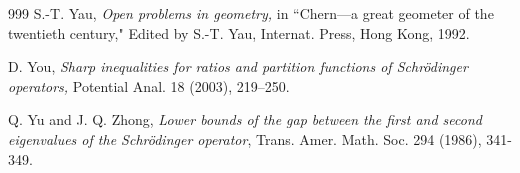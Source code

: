 \documentclass[11pt,leqno]{article}
\theoremstyle{definition}
\numberwithin{equation}{section}
\begin{document}
\begin{thebibliography}{999}
 S{.}-T{.} Yau, \emph{Open problems in geometry,} in 
``Chern---a great geometer of the twentieth century," Edited by  S{.}-T{.} Yau, 
Internat. Press, Hong Kong, 1992.

 D{.} You,  \emph{ Sharp inequalities for ratios and partition functions of
Schr\"odinger operators,} Potential Anal.  18 (2003),  219--250.


 Q. Yu and J. Q. Zhong,
\emph{Lower bounds of the gap between the first and second eigenvalues
of the Schr{\"o}dinger operator}, Trans. Amer. Math. Soc. 294 (1986), 341-349.



\end{thebibliography}
\end{document}
